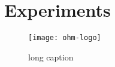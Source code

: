 \chapter{Experiments}\label{ch:experiments}

\Blindtext

\begin{sidewaysfigure}
	\texttt{[image: ohm-logo]}
	\caption[short text]{long caption}
\end{sidewaysfigure}
